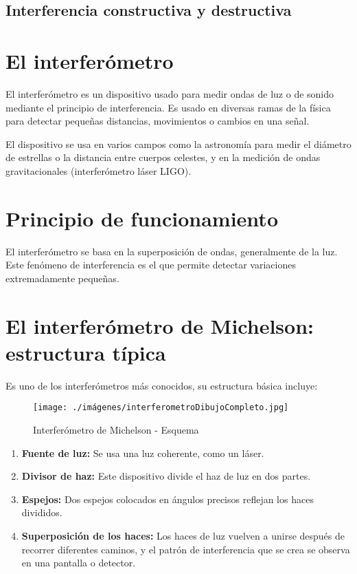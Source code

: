 \documentclass[a4paper, 12pt]{article}
\begin{document}
	\subsection{Interferencia constructiva y destructiva}
	
	\section{\textbf{El interferómetro}}

	\indent El interferómetro es un dispositivo usado para medir ondas de luz o de sonido mediante el principio de interferencia. Es usado en diversas ramas de la física para detectar pequeñas distancias, movimientos o cambios en una señal.
	
	\indent El dispositivo se usa en varios campos como la astronomía para medir el diámetro de estrellas o la distancia entre cuerpos celestes, y en la medición de ondas gravitacionales (interferómetro láser LIGO).
	
	\section {\textbf{Principio de funcionamiento}}

	\indent El interferómetro se basa en la superposición de ondas, generalmente de la luz. Este fenómeno de interferencia es el que permite detectar variaciones extremadamente pequeñas.
	
	\section{\textbf{El interferómetro de Michelson: estructura típica}}
	
	\indent Es uno de los interferómetros más conocidos, su estructura básica incluye: 
	
	\begin{figure}[h!]
		\centering
		\texttt{[image: ./imágenes/interferometroDibujoCompleto.jpg]}
		\caption{Interferómetro de Michelson - Esquema}
		\label{fig:interferometro2}
	\end{figure}
	
	\begin{enumerate}
		\item \textbf{Fuente de luz:} Se usa una luz coherente, como un láser.
		\item \textbf{Divisor de haz:} Este dispositivo divide el haz de luz en dos partes.
		\item \textbf{Espejos:} Dos espejos colocados en ángulos precisos reflejan los haces divididos.
		\item \textbf{Superposición de los haces:} Los haces de luz vuelven a unirse después de recorrer diferentes caminos, y el patrón de interferencia que se crea se observa en una pantalla o detector.
	\end{enumerate}
	\newpage
\end{document}
